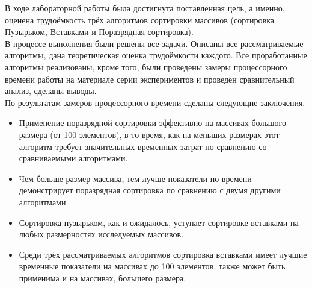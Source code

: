 В ходе лабораторной работы была достигнута поставленная цель, а именно, оценена трудоёмкость трёх алгоритмов сортировки массивов (сортировка Пузырьком, Вставками и Поразрядная сортировка).  \\

В процессе выполнения были решены все задачи. Описаны все рассматриваемые алгоритмы, дана теоретическая оценка трудоёмкости каждого. Все проработанные алгоритмы реализованы, кроме того, были проведены замеры процессорного времени работы на материале серии экспериментов и проведён сравнительный анализ, сделаны выводы.\\

По результатам замеров процессорного времени сделаны следующие заключения.
\begin{itemize}
	\item Применение поразрядной сортировки эффективно на массивах большого размера (от 100 элементов), в то время, как на меньших размерах этот алгоритм требует значительных временных затрат по сравнению со сравниваемыми алгоритмами.
	\item Чем больше размер массива, тем лучше показатели по времени демонстрирует поразрядная сортировка по сравнению с двумя другими алгоритмами.
	\item Сортировка пузырьком, как и ожидалось, уступает сортировке вставками на любых размерностях исследуемых массивов.
	\item Среди трёх рассматриваемых алгоритмов сортировка вставками имеет лучшие временные показатели на массивах до 100 элементов, также может быть применима и на массивах, большего размера.
\end{itemize}
